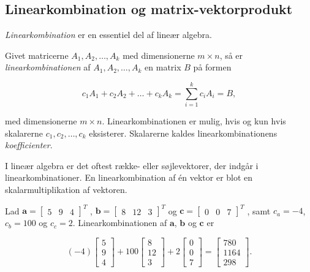 \subsection{Linearkombination og matrix-vektorprodukt}

\textit{Linearkombination} er en essentiel del af lineær algebra. 

\begin{defn}{}{}
Givet matricerne $A_1, A_2, \ldots, A_k$ med dimensionerne $m \times n$, så er \textit{linearkombinationen} af $A_1, A_2, \ldots, A_k$ en matrix $B$ på formen 

$$c_1A_1+c_2A_2+\ldots+c_kA_k=\sum\limits_{i=1}^k c_iA_i=B,$$

med dimensionerne $m \times n$. 
Linearkombinationen er mulig, hvis og kun hvis skalarerne $c_1, c_2, \ldots, c_k$ eksisterer. 
Skalarerne kaldes linearkombinationens \textit{koefficienter}.
\end{defn}

I lineær algebra er det oftest række- eller søjlevektorer, der indgår i linearkombinationer. 
En linearkombination af én vektor er blot en skalarmultiplikation af vektoren.

\begin{eks}
Lad 
$
\textbf{a}=
\begin{bmatrix}
5 & 9 & 4
\end{bmatrix}^T
$
,
$
\textbf{b}=
\begin{bmatrix}
8 & 12 & 3
\end{bmatrix}^T
$
og
$\textbf{c}=
\begin{bmatrix}
0 & 0 & 7
\end{bmatrix}^T
$
, samt $c_a=-4$, $c_b=100$ og $c_c=2$. Linearkombinationen af $\textbf{a}$, $\textbf{b}$ og $\textbf{c}$ er 

$$
(-4)
\begin{bmatrix}
5 \\ 
9 \\ 
4
\end{bmatrix}
+
100
\begin{bmatrix}
8 \\
12 \\ 
3
\end{bmatrix}
+
2
\begin{bmatrix}
0 \\
0 \\ 
7
\end{bmatrix}
=
\begin{bmatrix}
780 \\
1164 \\ 
298
\end{bmatrix}
\text{.}
$$

\end{eks}

